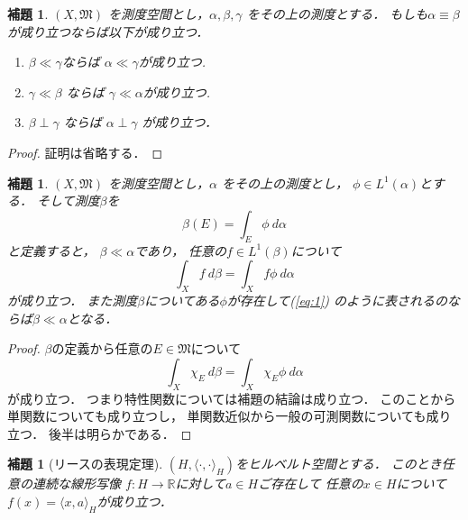 \documentclass[leqno, a4paper, 12pt]{jsarticle}
\newtheorem{lem}[thm]{補題}
\newcommand{\rr}{\mathbb{R}}
\begin{document}
\begin{lem}
$(X, \mathfrak{M})$
を測度空間とし，$\alpha, \beta, \gamma$
をその上の測度とする．
もしも$\alpha\equiv \beta$
が成り立つならば以下が成り立つ．
\begin{enumerate}
\item 
$\beta\ll \gamma$ならば
$\alpha\ll \gamma$が成り立つ. 
\item 
$\gamma\ll \beta$
ならば
$\gamma\ll \alpha$が成り立つ. 
\item 
$\beta\perp \gamma$
ならば
$\alpha\perp \gamma$
が成り立つ．
\end{enumerate}
\end{lem}
\begin{proof}
証明は省略する．
\end{proof}


\begin{lem}\label{lem:hyougen}
$(X, \mathfrak{M})$
を測度空間とし，$\alpha$
をその上の測度とし，
$\phi\in L^{1}(\alpha)$とする．
そして測度$\beta$を
\begin{equation}\label{eq:1}
\beta(E)=\int_{E}\phi\ d\alpha
\end{equation}
と定義すると，
$\beta\ll \alpha$であり，
任意の$f\in L^{1}(\beta)$について
\[
\int_{X}f\ d\beta
=
\int_{X}f\phi\ d\alpha
\]
が成り立つ．
また測度$\beta$についてある$\phi$が存在して(\ref{eq:1})
のように表されるのならば$\beta\ll \alpha$となる．
\end{lem}
\begin{proof}
$\beta$の定義から任意の$E\in \mathfrak{M}$について
\[
\int_{X}\chi_{E}\ d\beta=\int_{X} \chi_{E}\phi\ d\alpha
\]
が成り立つ．
つまり特性関数については補題の結論は成り立つ．
このことから単関数についても成り立つし，
単関数近似から一般の可測関数についても成り立つ．
後半は明らかである．
\end{proof}

\begin{lem}[リースの表現定理]\label{lem:riesz}
$(H, \langle \cdot, \cdot \rangle_{H})$をヒルベルト空間とする．
このとき任意の連続な線形写像
$f: H\to \rr$に対して$a\in H$ご存在して
任意の$x\in H$について
$f(x)=\langle x, a\rangle_{H}$が成り立つ．
\end{lem}
\end{document}
